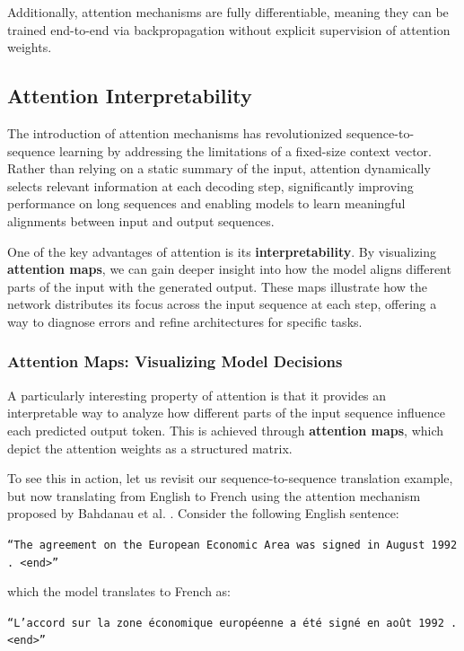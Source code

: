Additionally, attention mechanisms are fully differentiable, meaning they can be trained end-to-end via backpropagation without explicit supervision of attention weights.

\subsection{Attention Interpretability}

The introduction of attention mechanisms has revolutionized sequence-to-sequence learning by addressing the limitations of a fixed-size context vector. Rather than relying on a static summary of the input, attention dynamically selects relevant information at each decoding step, significantly improving performance on long sequences and enabling models to learn meaningful alignments between input and output sequences.

One of the key advantages of attention is its \textbf{interpretability}. By visualizing \textbf{attention maps}, we can gain deeper insight into how the model aligns different parts of the input with the generated output. These maps illustrate how the network distributes its focus across the input sequence at each step, offering a way to diagnose errors and refine architectures for specific tasks.

\subsubsection{Attention Maps: Visualizing Model Decisions}

A particularly interesting property of attention is that it provides an interpretable way to analyze how different parts of the input sequence influence each predicted output token. This is achieved through \textbf{attention maps}, which depict the attention weights as a structured matrix.

To see this in action, let us revisit our sequence-to-sequence translation example, but now translating from English to French using the attention mechanism proposed by Bahdanau et al. \cite{bahdanau2016_neural}. Consider the following English sentence:

\begin{center}
    \texttt{``The agreement on the European Economic Area was signed in August 1992 . <end>''}
\end{center}

which the model translates to French as:

\begin{center}
    \texttt{``L'accord sur la zone économique européenne a été signé en août 1992 . <end>''}
\end{center}


